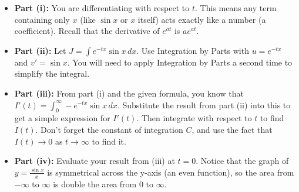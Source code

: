 \vspace{0.5cm}

\begin{hint}

\begin{itemize}
    \item \textbf{Part (i):} You are differentiating with respect to $t$. This means any term containing only $x$ (like $\sin x$ or $x$ itself) acts exactly like a number (a coefficient). Recall that the derivative of $e^{at}$ is $a e^{at}$.
    \item \textbf{Part (ii):} Let $J = \int e^{-tx} \sin x \, dx$. Use Integration by Parts with $u = e^{-tx}$ and $v' = \sin x$. You will need to apply Integration by Parts a second time to simplify the integral.
    \item \textbf{Part (iii):} From part (i) and the given formula, you know that $I'(t) = \int_{0}^{\infty} -e^{-tx} \sin x \, dx$. Substitute the result from part (ii) into this to get a simple expression for $I'(t)$. Then integrate with respect to $t$ to find $I(t)$. Don't forget the constant of integration $C$, and use the fact that $I(t) \to 0$ as $t \to \infty$ to find it.
    \item \textbf{Part (iv):} Evaluate your result from (iii) at $t=0$. Notice that the graph of $y = \frac{\sin x}{x}$ is symmetrical across the y-axis (an even function), so the area from $-\infty$ to $\infty$ is double the area from $0$ to $\infty$.
\end{itemize}

\end{hint}


